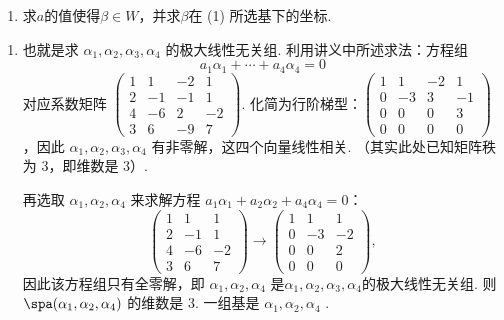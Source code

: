 \begin{exercise}
\begin{exgroup}
\begin{enumerate}
            \item 求$a$的值使得$\beta\in W$，并求$\beta$在 (1) 所选基下的坐标.
        \end{enumerate}
        \begin{answer}
            \begin{enumerate}
                \item 也就是求 $\alpha_1,\alpha_2,\alpha_3,\alpha_4$ 的极大线性无关组. 利用讲义中所述求法：方程组
                      \[ a_1\alpha_1+\cdots+a_4\alpha_4=0 \]
                      对应系数矩阵 $\begin{pmatrix}
                              1 & 1  & -2 & 1  \\
                              2 & -1 & -1 & 1  \\
                              4 & -6 & 2  & -2 \\
                              3 & 6  & -9 & 7\end{pmatrix}$. 化简为行阶梯型：$\begin{pmatrix}
                              1 & 1  & -2 & 1  \\
                              0 & -3 & 3  & -1 \\
                              0 & 0  & 0  & 3  \\
                              0 & 0  & 0  & 0\end{pmatrix}$，因此 $\alpha_1,\alpha_2,\alpha_3,\alpha_4$ 有非零解，这四个向量线性相关. （其实此处已知矩阵秩为 3，即维数是 3）.

                      再选取 $\alpha_1,\alpha_2,\alpha_4$ 来求解方程 $a_1\alpha_1+a_2\alpha_2+a_4\alpha_4=0$：
                      \[\begin{pmatrix}
                              1 & 1  & 1  \\
                              2 & -1 & 1  \\
                              4 & -6 & -2 \\
                              3 & 6  & 7\end{pmatrix}\rightarrow\begin{pmatrix}
                              1 & 1  & 1  \\
                              0 & -3 & -2 \\
                              0 & 0  & 2  \\
                              0 & 0  & 0\end{pmatrix},\]
                      因此该方程组只有全零解，即 $\alpha_1,\alpha_2,\alpha_4$ 是$\alpha_1,\alpha_2,\alpha_3,\alpha_4$的极大线性无关组. 则 $\spa(\alpha_1,\alpha_2,\alpha_4)$ 的维数是 3. 一组基是 $\alpha_1,\alpha_2,\alpha_4$ .


\end{enumerate}
\end{answer}
\end{exgroup}
\end{exercise}
